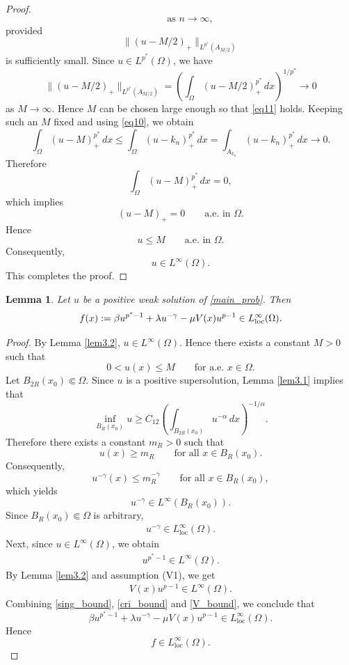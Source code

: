 \documentclass[12pt]{extarticle}
\newtheorem{lemma}[theorem]{Lemma}
\theoremstyle{definition}
\theoremstyle{remark}
\theoremstyle{definition}
\numberwithin{equation}{section}
\numberwithin{equation}{section}
\begin{document}
\begin{proof}
\begin{equation}
			\qquad\text{as } n\to\infty,
		\end{equation}		
		provided		
		\begin{equation}\label{eq11}
			\|(u-M/2)_+\|_{L^{p^*}(A_{M/2})}
		\end{equation}
		is sufficiently small.		
		Since $u\in L^{p^*}(\Omega)$, we have		
		\[
		\|(u-M/2)_+\|_{L^{p^*}(A_{M/2})}
		=
		\left(
		\int_\Omega (u-M/2)_+^{p^*}\,dx
		\right)^{1/p^*}
		\longrightarrow 0
		\]		
		as $M\to\infty$. Hence $M$ can be chosen large enough so that
		\eqref{eq11} holds.		
		Keeping such an $M$ fixed and using \eqref{eq10}, we obtain		
		\[
		\int_\Omega (u-M)_+^{p^*}\,dx
		\le
		\int_\Omega (u-k_n)_+^{p^*}\,dx
		=
		\int_{A_{k_n}} (u-k_n)_+^{p^*}\,dx
		\longrightarrow 0 .
		\]		
		Therefore		
		\[
		\int_\Omega (u-M)_+^{p^*}\,dx=0,
		\]		
		which implies		
		\[
		(u-M)_+=0
		\qquad\text{a.e. in }\Omega.
		\]		
		Hence		
		\[
		u\le M
		\qquad\text{a.e. in }\Omega.
		\]		
		Consequently,		
		\[
		u\in L^\infty(\Omega).
		\]		
		This completes the proof.
	\end{proof}


		\begin{lemma}\label{rhsbounded}
			Let $u$ be a positive weak solution of \eqref{main_prob}. Then
			\[
			f(x):=
			\beta u^{p^*-1}
			+\lambda u^{-\gamma}
			-\mu V(x)u^{p-1}
			\in L^\infty_{\rm loc}(\Omega).
			\]
		\end{lemma}
		
		\begin{proof}
			By Lemma \ref{lem3.2}, $u\in L^\infty(\Omega)$. Hence there exists a constant $M>0$ such that
			\[
			0<u(x)\le M
			\qquad \text{for a.e. }x\in\Omega.
			\]			
			Let $B_{2R}(x_0)\Subset\Omega$.	Since $u$ is a positive supersolution, Lemma \ref{lem3.1}
			implies that
			\[
			\inf_{B_R(x_0)}u
			\ge
			C_{12}
			\left(
			\int_{B_{2R}(x_0)}
			u^{-\alpha}\,dx
			\right)^{-1/\alpha}.
			\]			
			Therefore there exists a constant
			$m_R>0$ such that
			\[
			u(x)\ge m_R
			\qquad
			\text{for all }
			x\in B_R(x_0).
			\]			
			Consequently,
			\[
			u^{-\gamma}(x)
			\le
			m_R^{-\gamma}
			\qquad
			\text{for all }
			x\in B_R(x_0),
			\]
			which yields
			\[
			u^{-\gamma}
			\in
			L^\infty(B_R(x_0)).
			\]			
			Since $B_R(x_0)\Subset\Omega$ is arbitrary,
			\begin{align}\label{sing_bound}
				u^{-\gamma}
				\in
				L^\infty_{\mathrm{loc}}(\Omega).
			\end{align}			
			Next, since $u\in L^\infty(\Omega)$, we obtain
		\begin{align}\label{cri_bound}
			u^{p^*-1}
			\in
			L^\infty(\Omega).
		\end{align}
 By Lemma \ref{lem3.2} and assumption (V1), we get 
        \begin{align}\label{V_bound}
        	V(x)u^{p-1}
        	\in
        	L^\infty(\Omega).
        \end{align}			
			Combining \eqref{sing_bound}, \eqref{cri_bound} and \eqref{V_bound},
			we conclude that
			\[
			\beta u^{p^*-1}
			+\lambda u^{-\gamma}
			-\mu V(x)u^{p-1}
			\in
			L^\infty_{\mathrm{loc}}(\Omega).
			\]			
			Hence
			\[
			f\in L^\infty_{\mathrm{loc}}(\Omega).
			\]
		\end{proof}
	
\end{document}
